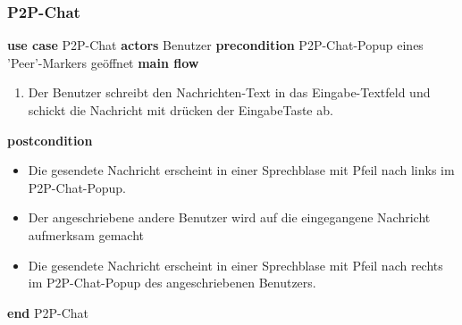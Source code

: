\subsubsection{P2P-Chat}\label{subsubsec:uc_chatp2p}
\noindent \textbf{use case} P2P-Chat \newline
\indent \textbf{actors} \newline
\indent \indent Benutzer \newline
\indent \textbf{precondition} \newline
\indent \indent P2P-Chat-Popup eines 'Peer'-Markers geöffnet \newline
\indent \textbf{main flow}
\begin{enumerate}[labelwidth=0pt,leftmargin=39pt,noitemsep,topsep=0pt,parsep=0pt,partopsep=0pt]
\item Der Benutzer schreibt den Nachrichten-Text in das Eingabe-Textfeld und schickt die Nachricht mit drücken der EingabeTaste ab.
\end{enumerate}
\indent \indent \textbf{postcondition}
\begin{itemize}[label={},labelwidth=0pt,leftmargin=24pt,noitemsep,topsep=0pt,parsep=0pt,partopsep=0pt]
\item Die gesendete Nachricht erscheint in einer Sprechblase mit Pfeil nach links im P2P-Chat-Popup.
\item Der angeschriebene andere Benutzer wird auf die eingegangene Nachricht aufmerksam gemacht
\item Die gesendete Nachricht erscheint in einer Sprechblase mit Pfeil nach rechts im P2P-Chat-Popup des angeschriebenen Benutzers.
\end{itemize}
\noindent \textbf{end} P2P-Chat \newline

